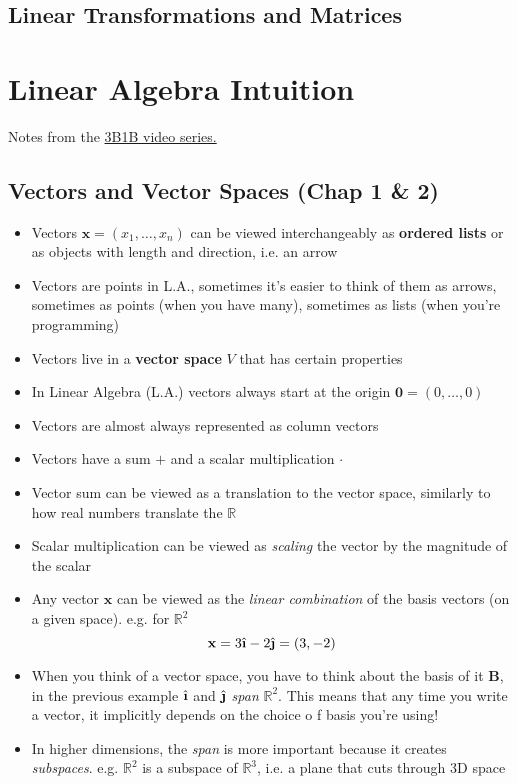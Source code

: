 \documentclass[pdftex,11pt,a4paper]{article}
\newcommand{\R}{\mathbb{R}}
\newcommand{\B}{\mathbf{B}}
\newcommand{\zero}{\mathbf{0}}
\newcommand{\ihat}{\hat{\textbf{\i}}}
\newcommand{\jhat}{\hat{\textbf{\j}}}
\newcommand{\xn}{\mathbf{x}}
\begin{document}
\subsection{Linear Transformations and Matrices}

\section{Linear Algebra Intuition}
Notes from the \href{https://www.youtube.com/watch?v=fNk_zzaMoSs&list=PLZHQObOWTQDPD3MizzM2xVFitgF8hE_ab}{3B1B video series.}
\subsection{Vectors and Vector Spaces (Chap 1 \& 2)}
\begin{itemize}
	\item Vectors $\xn = (x_1, \ldots, x_n)$ can be viewed interchangeably as \textbf{ordered lists} or as objects with length and direction, i.e. an arrow
	\item Vectors are points in L.A., sometimes it's easier to think of them as arrows, sometimes as points (when you have many), sometimes as lists (when you're programming)
	\item Vectors live in a \textbf{vector space} $V$ that has certain properties 
	\item In Linear Algebra (L.A.) vectors always start at the origin $\zero = (0,\ldots,0)$
	\item Vectors are almost always represented as column vectors
	\item Vectors have a sum $+$ and a scalar multiplication $\cdot$
	\item Vector sum can be viewed as a translation to the vector space, similarly to how real numbers translate the $\R$
	\item Scalar multiplication can be viewed as \textit{scaling} the vector by the magnitude of the scalar
	\item Any vector $\xn$ can be viewed as the \textit{linear combination} of the basis vectors (on a given space). e.g. for $\R^2$
	$$\xn = 3\ihat -2\jhat = (3,-2)$$
	\item When you think of a vector space, you have to think about the basis of it $\B$, in the previous example $\ihat$ and $\jhat$ \textit{span} $\R^2$. This means that any time you write a vector, it implicitly depends on the choice o f basis you're using!
	\item In higher dimensions, the \textit{span} is more important because it creates \textit{subspaces}. e.g. $\mathbb{R}^2$ is a subspace of $\mathbb{R}^3$, i.e. a plane that cuts through 3D space
\end{itemize}
\end{document}
